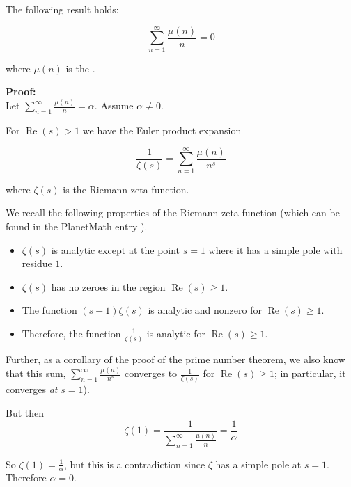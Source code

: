 \documentclass[12pt]{article}
\begin{document}
The following result holds:

\[ \sum_{n=1}^{\infty} \frac{\mu(n)}{n} = 0 \]

where $\mu(n)$ is the .

{\bf Proof:}\\
Let $\sum_{n=1}^{\infty} \frac{\mu(n)}{n} = \alpha$.  Assume $\alpha \neq 0$.

For $\operatorname{Re}(s) > 1$ we have the Euler product expansion

\[ \frac{1}{\zeta(s)} = \sum_{n=1}^\infty \frac{\mu(n)}{n^s} \]

where $\zeta(s)$ is the Riemann zeta function.  

We recall the following properties of the Riemann zeta function (which can be found in the PlanetMath entry ).
\begin{itemize}
\item $\zeta(s)$ is analytic except at the point $s=1$ where it has a simple pole with residue $1$.
\item $\zeta(s)$ has no zeroes in the region $\operatorname{Re}(s) \geq 1$.  
\item The function $(s-1) \zeta(s)$ is analytic and nonzero for $\operatorname{Re}(s) \geq 1$.
\item Therefore, the function $\frac{1}{\zeta(s)}$ is analytic for $\operatorname{Re}(s) \geq 1$.
\end{itemize}

Further, as a corollary of the proof of the prime number theorem, we also know that this sum, $\sum_{n=1}^\infty \frac{\mu(n)}{n^s}$ converges to $\frac{1}{\zeta(s)}$ for $\operatorname{Re}(s) \geq 1$; in particular, it converges \emph{at} $s=1$).

But then
 \[ \zeta(1) = \frac{1}{\sum_{n=1}^\infty \frac{\mu(n)}{n}} = \frac{1}{\alpha} \]

So $\zeta(1)=\frac{1}{\alpha}$, but this is a contradiction since $\zeta$ has a simple pole at $s=1$.  Therefore $\alpha = 0$.
\end{document}
